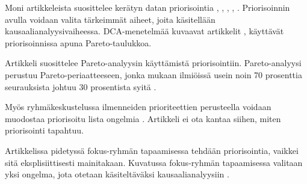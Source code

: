 Moni artikkeleista suosittelee kerätyn datan priorisointia \citep{card1998learning}, \citep{birk2002postmortem}, \citep{staalhane2003post}, \citep{staalhane2004root}, \citep{karlsson2006case}. Priorisoinnin avulla voidaan valita tärkeimmät aiheet, joita käsitellään kausaalianalyysivaiheessa. DCA-menetelmää kuvaavat artikkelit \citep{kalinowski2012evidence}, \citep{card1998learning} käyttävät priorisoinnissa apuna Pareto-taulukkoa.

Artikkeli \citep{staalhane2004root} suosittelee Pareto-analyysin käyttämistä priorisointiin. Pareto-analyysi perustuu Pareto-periaatteeseen, jonka mukaan ilmiöissä usein noin 70 prosenttia seurauksista johtuu 30 prosentista syitä \citep{staalhane2004root}. 

Myös ryhmäkeskustelussa ilmenneiden prioriteettien perusteella voidaan muodostaa priorisoitu lista ongelmia \citep{staalhane2003post}. Artikkeli \citep{birk2002postmortem} ei ota kantaa siihen, miten priorisointi tapahtuu.

Artikkelissa \citep{Lehtinen2011} pidetyssä fokus-ryhmän tapaamisessa tehdään priorisointia, vaikkei sitä eksplisiittisesti mainitakaan. Kuvatussa fokus-ryhmän tapaamisessa valitaan yksi ongelma, jota otetaan käsiteltäväksi kausaalianalyysiin \citep{Lehtinen2011}.

